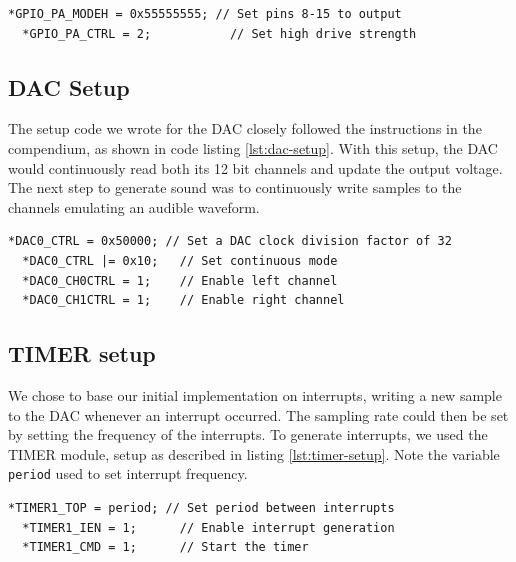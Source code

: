 \noindent\begin{minipage}[c]{\textwidth}
  \begin{lstlisting}[caption=Setting GPIO pins 8-15 as output,label={lst:gpio-setup2}]
  *GPIO_PA_MODEH = 0x55555555; // Set pins 8-15 to output
  *GPIO_PA_CTRL = 2;           // Set high drive strength
  \end{lstlisting}
\end{minipage}


\subsection{DAC Setup}
The setup code we wrote for the DAC closely followed the instructions in the compendium, as shown in code listing \ref{lst:dac-setup}. With this setup, the DAC would continuously read both its 12 bit channels and update the output voltage. The next step to generate sound was to continuously write samples to the channels emulating an audible waveform.\\

\noindent\begin{minipage}[c]{\textwidth}
  \begin{lstlisting}[caption=Setting up the DAC,label={lst:dac-setup}]
  *DAC0_CTRL = 0x50000; // Set a DAC clock division factor of 32
  *DAC0_CTRL |= 0x10;   // Set continuous mode
  *DAC0_CH0CTRL = 1;    // Enable left channel
  *DAC0_CH1CTRL = 1;    // Enable right channel
  \end{lstlisting}
\end{minipage}

\subsection{TIMER setup}
We chose to base our initial implementation on interrupts, writing a new sample to the DAC whenever an interrupt occurred. The sampling rate could then be set by setting the frequency of the interrupts. To generate interrupts, we used the TIMER module, setup as described in listing \ref{lst:timer-setup}. Note the variable \texttt{period} used to set interrupt frequency. \\

\noindent\begin{minipage}[c]{\textwidth}
  \begin{lstlisting}[caption=Setting up the timer to generate interrupts,label={lst:timer-setup}]
  *TIMER1_TOP = period; // Set period between interrupts
  *TIMER1_IEN = 1;      // Enable interrupt generation
  *TIMER1_CMD = 1;      // Start the timer
  \end{lstlisting}
\end{minipage}

